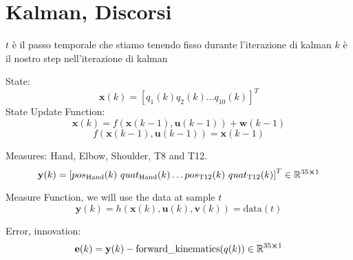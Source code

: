 
\graphicspath{{./figs/}}


\author{Alessia Biondi, Andrea Ferroni e Francesco Petracci} 





 
\section{Kalman, Discorsi}

$t$ \`e il passo temporale che stiamo tenendo fisso durante l'iterazione di kalman
$k$ \`e il nostro step nell'iterazione  di kalman


State: 
\begin{equation}
	\textbf{x}(k) = \left[q_1 (k) q_2 (k) \dots q_{10} (k) \right]^T
\end{equation}
State Update Function:
\begin{equation}
	\textbf{x}(k) = f(\textbf{x}(k-1), \textbf{u}(k-1) ) + \textbf{w}(k-1)
\end{equation}
\begin{equation}
	f(\textbf{x}(k-1), \textbf{u}(k-1) ) = \textbf{x}(k-1)
\end{equation}


Measures:
Hand, Elbow, Shoulder, T8 and T12.
\begin{equation}
\textbf{y}(k) = \left[ 	pos_{\text{Hand}}(k) \ quat_{\text{Hand}}(k) \dots
						pos_{\text{T12}}(k) \ quat_{\text{T12}}(k) 
						 \right]^T \in \mathbb{R}^{35 \cross 1}
\end{equation}

Measure Function, we will use the data at sample $t$
\begin{equation}
	\textbf{y}(k) = h(\textbf{x}(k), \textbf{u}(k), \textbf{v}(k) ) = \text{data}(t)
\end{equation}

Error, innovation:
\begin{equation}
	\textbf{e}(k) = \textbf{y}(k) -  \text{forward\_kinematics}(q(k)) \in \mathbb{R}^{35 \cross 1}
\end{equation}



	
